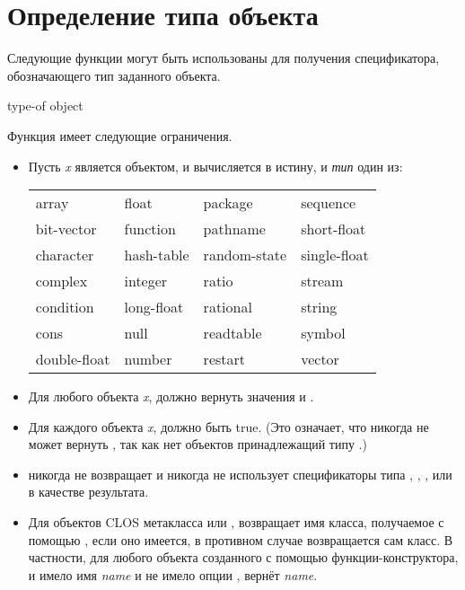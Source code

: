 \section{Определение типа объекта}

Следующие функции могут быть использованы для получения спецификатора,
обозначающего тип заданного объекта.

\begin{defun}[Функция]
type-of object

Функция имеет следующие ограничения.
\begin{itemize}
\item
  Пусть \emph{x} является объектом, и 
  вычисляется в истину, и \emph{тип} один из:

  \begin{flushleft}
    \begin{tabular}{@{}llll@{}}
      array          & float        & package        & sequence \\
      bit-vector     & function     & pathname       & short-float \\
      character      & hash-table   & random-state   & single-float \\
      complex        & integer      & ratio          & stream \\
      condition      & long-float   & rational       & string \\
      cons           & null         & readtable      & symbol \\
      double-float   & number       & restart        & vector
    \end{tabular}
  \end{flushleft}

\item
  Для любого объекта \emph{x}, 
  должно вернуть значения  и .

\item
  Для каждого объекта \emph{x}, 
  должно быть true. (Это означает, что  никогда не может вернуть
  , так как нет объектов принадлежащий типу .)

\item
   никогда не возвращает  и никогда не использует
  спецификаторы типа , , ,  или  в
  качестве результата.

\item
  Для объектов CLOS метакласса  или ,
   возвращает имя класса, получаемое с помощью , если оно
  имеется, в противном случае возвращается сам класс.
  В частности, для любого объекта созданного с помощью 
  функции-конструктора, и  имело имя \emph{name} и не имело опции
  ,  вернёт \emph{name}.
\end{itemize}


\end{defun}
